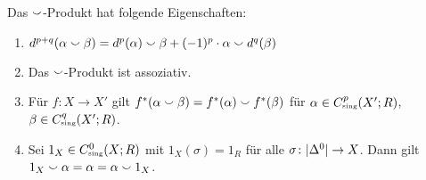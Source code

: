 \begin{lemma}[{name=[Eigenschaften des Cup-Produktes]}]
	Das $\smallsmile$-Produkt hat folgende Eigenschaften:
	\begin{enumerate}[1)]
		\item $d^{p+q}(\alpha \smallsmile \beta) = d^p(\alpha) \smallsmile \beta + (-1)^p \cdot \alpha \smallsmile d^q(\beta)$
		\item Das $\smallsmile$-Produkt ist assoziativ.
		\item Für $f \colon X \to X'$ gilt $f^*(\alpha \smallsmile \beta)= f^*(\alpha) \smallsmile f^*(\beta)$ für $\alpha \in C^p_\sing(X';R)$, $\beta \in C^q_\sing(X';R)$.
		\item Sei $1_X \in C_\sing^0(X;R)$ mit $1_X(\sigma)=1_R$ für alle $\sigma \colon \lvert\Delta^0\rvert \to X$. Dann gilt $1_X \smallsmile \alpha = \alpha = \alpha\smallsmile 1_X$.
	\end{enumerate}
\end{lemma}
